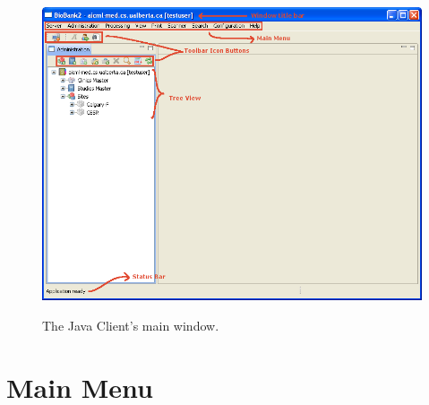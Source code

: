 \begin{figure}[h]
  \centering
  \scalebox{0.4}
	   { \includegraphics*{screenshots/overview/main_window} }
	   \caption{The Java Client's main window.}
	   \label{fig:main_window}
\end{figure}

\clearpage
\section{Main Menu}
\label{sec:main_menu}

